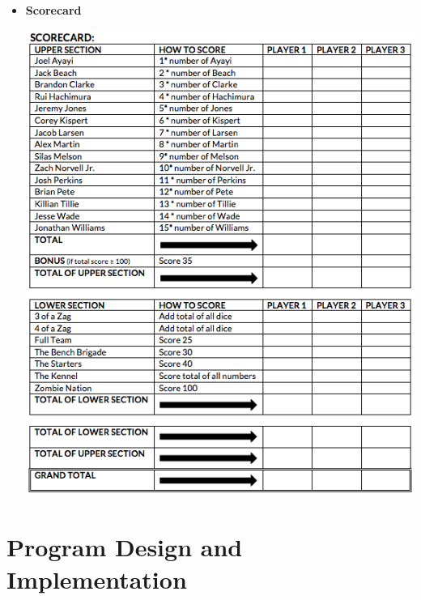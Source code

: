 \documentclass[]{report}   %
\begin{document}
\begin{itemize}
\begin{itemize}
\vspace{2.3in}
\item \textbf{Scorecard}
\begin{center}
\includegraphics[width=5in]{Graphics/ScorecardScreenshot}
\end{center}
\end{itemize}
\end{itemize}


\chapter{Program Design and Implementation}           %
\end{document}
